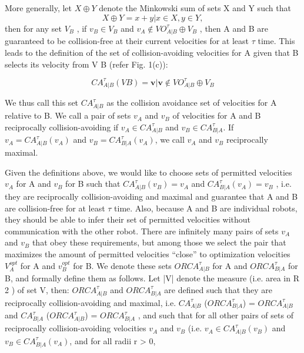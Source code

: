 \documentclass[12pt]{report}
\begin{document}
More generally, let $X \oplus Y$ denote the Minkowski sum of sets X and Y such that
\begin{equation}
X \oplus Y = {x + y | x \in X, y \in Y },
\end{equation}
then for any set $V_{B}$ , if $v_{B} \in V_{B}$ and $v_{A} \notin VO^{\tau}_{A|B} \oplus V_{B}$ , then A and B are guaranteed to be collision-free at their current velocities for at least $\tau$ time. This leads to the definition of the set of collision-avoiding velocities for A given that B selects its velocity from V B (refer Fig. 1(c)):

\begin{equation}
CA^{\tau}_{A|B}(V B ) = {\textbf{v} | \textbf{v} \notin VO^{\tau}_{A|B} \oplus V_{B} }\tag{3}
\end{equation}

We thus call this set $CA^{\tau}_{A|B}$ as the collision avoidance set of velocities for A relative to B. We call a pair of sets $v_{A}$ and $v_{B}$ of velocities for A and B reciprocally collision-avoiding if $v_{A} \in CA^{\tau}_{A|B}$ and $v_{B} \in CA^{\tau}_{B|A}$. If $v_{A} = CA^{\tau}_{A|B}(v_{A})$ and $v_{B} = CA^{\tau}_{B|A}(v_{A})$, we call $v_{A}$ and $v_{B}$ reciprocally maximal.\newline

Given the definitions above, we would like to choose sets of permitted velocities
$v_{A}$ for A and $v_{B}$ for B such that $CA^{\tau}_{A|B}(v_{B}) = v_{A}$ and $CA^{\tau}_{B|A}(v_{A}) = v_{B}$ , i.e. they are reciprocally collision-avoiding and maximal and guarantee that A and B are collision-free for at least $\tau$ time. Also, because A and B are individual robots, they should be able to infer their set of permitted velocities without communication with the other robot. There are infinitely many pairs of sets $v_{A}$ and $v_{B}$ that obey these requirements, but among those we select the pair that maximizes the amount of permitted velocities “close” to optimization velocities $V^{opt}_{A}$ for A and $v^{opt}_{B}$ for B. We denote these sets $ORCA^{\tau}_{A|B}$ for A and $ORCA^{\tau}_{B|A}$ for B, and formally define them as follows. Let |V| denote the measure (i.e. area in R 2 ) of set V, then:
$ORCA^{\tau}_{A|B}$ and $ORCA^{\tau}_{B|A}$ are defined such that they are reciprocally collision-avoiding and maximal, i.e. $CA^{\tau}_{A|B}$ ($ORCA^{\tau}_{B|A}$) = $ORCA^{\tau}_{A|B}$ and $CA^{\tau}_{B|A}$ ($ORCA^{\tau}_{A|B}$) = $ORCA^{\tau}_{B|A}$ , and such that for all other pairs of sets of reciprocally collision-avoiding velocities $v_{A}$ and $v_{B}$ (i.e. $v_{A} \in CA^{\tau}_{A|B}(v_{B})$ and $v_{B} \in CA^{\tau}_{B|A}(v_{A})$, and for all radii r > 0,
\end{document}
